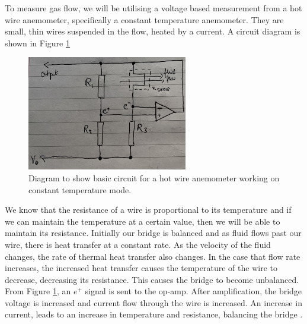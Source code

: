 \documentclass[11pt]{article}
\numberwithin{equation}{section}
\begin{document}
To measure gas flow, we will be utilising a voltage based measurement from a hot wire anemometer, specifically a constant temperature anemometer. They are small, thin wires suspended in the flow, heated by a current. A circuit diagram is shown in Figure \ref{fig:q2i1}
\begin{figure}[H]
    \centering
    \includegraphics[height = 5cm]{./img/q2i1.jpg}
    \caption{Diagram to show basic circuit for a hot wire anemometer working on constant temperature mode.} 
    \label{fig:q2i1}
 \end{figure}
We know that the resistance of a wire is proportional to its temperature and if we can maintain the temperature at a certain value, then we will be able to maintain its resistance. Initially our bridge is balanced and as fluid flows past our wire, there is heat transfer at a constant rate. As the velocity of the fluid changes, the rate of thermal heat transfer also changes. In the case that flow rate increases, the increased heat transfer causes the temperature of the wire to decrease, decreasing its resistance. This causes the bridge to become unbalanced. From Figure \ref{fig:q2i1}, an $e^+$ signal is sent to the op-amp. After amplification, the bridge voltage is increased and current flow through the wire is increased. An increase in current, leads to an increase in temperature and resistance, balancing the bridge \cite{b1}. 
\end{document}
